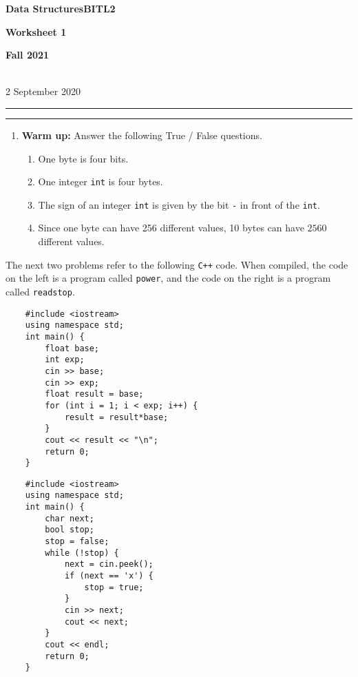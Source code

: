 \documentclass[a4paper,12pt]{article}
\begin{document}
\begin{center}
\parbox{3.5cm}{\flushleft\bf Data Structures\linebreak BITL2} \hfill {\bf\Huge Worksheet 1} \hfill \parbox{3.5cm}{\flushright\bf Fall 2021} \\[8pt]
\rm\small 2 September 2020
\end{center}

\hrule\vspace{2pt}\hrule

\begin{enumerate}

\item \textbf{Warm up:} Answer the following True / False questions.
\begin{enumerate}
\item One byte is four bits.
\item One integer \texttt{int} is four bytes.
\item The sign of an integer \texttt{int} is given by the bit \texttt{-} in front of the \texttt{int}.
\item Since one byte can have 256 different values, 10 bytes can have $2560$ different values.
\end{enumerate}
\end{enumerate}

\vfill
\noindent
The next two problems refer to the following \texttt{C++} code. When compiled, the code on the left is a program called \texttt{power}, and the code on the right is a program called \texttt{readstop}.
\begin{multicols}{2}
{\fontsize{9}{10}\selectfont
\begin{verbatim}
    #include <iostream>
    using namespace std;
    int main() {
        float base;
        int exp;
        cin >> base;
        cin >> exp;
        float result = base;
        for (int i = 1; i < exp; i++) {
            result = result*base;
        }
        cout << result << "\n";
        return 0;
    }

\end{verbatim}
}
{\fontsize{9}{10}\selectfont
\begin{verbatim}
    #include <iostream>
    using namespace std;
    int main() {
        char next;
        bool stop;
        stop = false;
        while (!stop) {
            next = cin.peek();
            if (next == 'x') {
                stop = true;
            }
            cin >> next;
            cout << next;
        }
        cout << endl;
        return 0;
    }
\end{verbatim}
}
\end{multicols}
\end{document}
